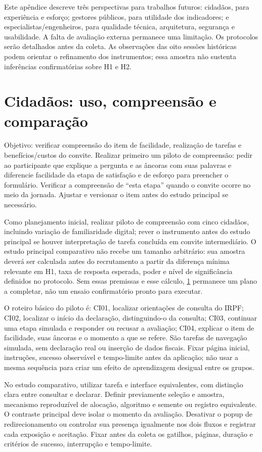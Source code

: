 \begin{apendicesenv}
Este apêndice descreve três perspectivas para trabalhos futuros: cidadãos, para experiência e esforço; gestores públicos, para utilidade dos indicadores; e especialistas/engenheiros, para qualidade técnica, arquitetura, segurança e usabilidade. A falta de avaliação externa permanece uma limitação. Os protocolos serão detalhados antes da coleta. As observações das oito sessões históricas podem orientar o refinamento dos instrumentos; essa amostra não sustenta inferências confirmatórias sobre H1 e H2.

\section{Cidadãos: uso, compreensão e comparação}
\label{sec:K.1}

Objetivo: verificar compreensão do item de facilidade, realização de tarefas e benefícios/custos do convite. Realizar primeiro um piloto de compreensão: pedir ao participante que explique a pergunta e as âncoras com suas palavras e diferencie facilidade da etapa de satisfação e de esforço para preencher o formulário. Verificar a compreensão de ``esta etapa'' quando o convite ocorre no meio da jornada. Ajustar e versionar o item antes do estudo principal se necessário.

Como planejamento inicial, realizar piloto de compreensão com cinco cidadãos, incluindo variação de familiaridade digital; rever o instrumento antes do estudo principal se houver interpretação de tarefa concluída em convite intermediário. O estudo principal comparativo não recebe um tamanho arbitrário: sua amostra deverá ser calculada antes do recrutamento a partir da diferença mínima relevante em H1, taxa de resposta esperada, poder e nível de significância definidos no protocolo. Sem essas premissas e esse cálculo, \ref{sec:K.1} permanece um plano a completar, não um ensaio confirmatório pronto para executar.

O roteiro básico do piloto é: CI01, localizar orientações de consulta do IRPF; CI02, localizar o início da declaração, distinguindo-o da consulta; CI03, continuar uma etapa simulada e responder ou recusar a avaliação; CI04, explicar o item de facilidade, suas âncoras e o momento a que se refere. São tarefas de navegação simulada, sem declaração real ou inserção de dados fiscais. Fixar página inicial, instruções, sucesso observável e tempo-limite antes da aplicação; não usar a mesma sequência para criar um efeito de aprendizagem desigual entre os grupos.

No estudo comparativo, utilizar tarefa e interface equivalentes, com distinção clara entre consultar e declarar. Definir previamente seleção e amostra, mecanismo reproduzível de alocação, algoritmo e semente ou registro equivalente. O contraste principal deve isolar o momento da avaliação. Desativar o popup de redirecionamento ou controlar sua presença igualmente nos dois fluxos e registrar cada exposição e aceitação. Fixar antes da coleta os gatilhos, páginas, duração e critérios de sucesso, interrupção e tempo-limite.


\end{apendicesenv}

